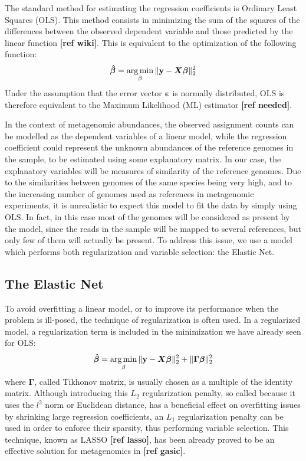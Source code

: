 The standard method for estimating the regression coefficients is Ordinary Least Squares (OLS). This method consists in minimizing the sum of the squares of the differences between the observed dependent variable and those predicted by the linear function \textbf{[ref wiki]}. This is equivalent to the optimization of the following function:
\begin{equation*}
    \boldsymbol{\hat{\beta}} = \operatorname*{arg\,min}_{\beta}{\lVert\mathbf{y} - \boldsymbol{X}\boldsymbol{\beta}\rVert_2^2}
\end{equation*}
Under the assumption that the error vector $\boldsymbol{\varepsilon}$ is normally distributed, OLS is therefore equivalent to the Maximum Likelihood (ML) estimator \textbf{[ref needed]}.

In the context of metagenomic abundances, the observed assignment counts can be modelled as the dependent variables of a linear model, while the regression coefficient could represent the unknown abundances of the reference genomes in the sample, to be estimated using some explanatory matrix. In our case, the explanatory variables will be measures of similarity of the reference genomes. Due to the similarities between genomes of the same species being very high, and to the increasing number of genomes used as references in metagenomic experiments, it is unrealistic to expect this model to fit the data by simply using OLS. In fact, in this case most of the genomes will be considered as present by the model, since the reads in the sample will be mapped to several references, but only few of them will actually be present. To address this issue, we use a model which performs both regularization and variable selection: the Elastic Net.

\subsection{The Elastic Net}

To avoid overfitting a linear model, or to improve its performance when the problem is ill-posed, the technique of regularization is often used. In a regularized model, a regularization term is included in the minimization we have already seen for OLS:
\begin{equation*}
    \boldsymbol{\hat{\beta}} = \operatorname*{arg\,min}_{\beta}{\lVert\mathbf{y} - \boldsymbol{X}\boldsymbol{\beta}\rVert_2^2} + \lVert\boldsymbol{\Gamma}\boldsymbol{\beta}\rVert_2^2
\end{equation*}
where $\boldsymbol{\Gamma}$, called Tikhonov matrix, is usually chosen as a multiple of the identity matrix. Although introducing this $L_2$ regularization penalty, so called because it uses the $l^2$ norm or Euclidean distance, has a beneficial effect on overfitting issues by shrinking large regression coefficients, an $L_1$ regularization penalty can be used in order to enforce their sparsity, thus performing variable selection. This technique, known as LASSO \textbf{[ref lasso]}, has been already proved to be an effective solution for metagenomics in \textbf{[ref gasic]}.

